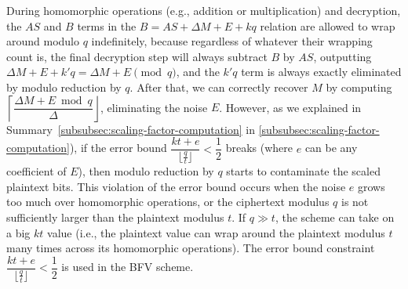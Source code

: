 $ $

 During homomorphic operations (e.g., addition or multiplication) and decryption, the $AS$ and $B$ terms in the $B = AS + \Delta M + E + kq$ relation are allowed to wrap around modulo $q$ indefinitely, because regardless of whatever their wrapping count is, the final decryption step will always subtract $B$ by $AS$, outputting $\Delta M + E + k'q = \Delta M + E \pmod q$, and the $k'q$ term is always exactly eliminated by modulo reduction by $q$. After that, we can correctly recover $M$ by computing $\left\lceil \dfrac{\Delta M + E \bmod q}{\Delta}\right\rfloor$, eliminating the noise $E$. However, as we explained in Summary~\ref*{subsubsec:scaling-factor-computation} in \autoref{subsubsec:scaling-factor-computation}), if the error bound $\dfrac{kt + e}{\lfloor\frac{q}{t}\rfloor} < \dfrac{1}{2}$ breaks (where $e$ can be any coefficient of $E$), then modulo reduction by $q$ starts to contaminate the scaled plaintext bits. This violation of the error bound occurs when the noise $e$ grows too much over homomorphic operations, or the ciphertext modulus $q$ is not sufficiently larger than the plaintext modulus $t$. If $q \gg t$, the scheme can take on a big $kt$ value (i.e., the plaintext value can wrap around the plaintext modulus $t$ many times across its homomorphic operations). The error bound constraint  $\dfrac{kt + e}{\lfloor\frac{q}{t}\rfloor} < \dfrac{1}{2}$ is used in the BFV scheme.  %

 